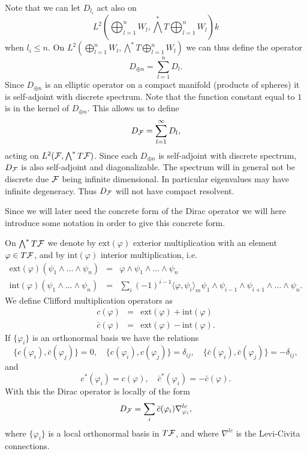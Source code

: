 \documentclass[letterpaper,12pt]{article}
\def\cf{{\cal F}}
\newcommand{\cF}{{\cal F}}
\begin{document}
Note that we can  let $D_{l_i}$ act also on   $$L^2 (\bigoplus_{l=1}^nW_l, \bigwedge^* T\bigoplus_{l=1}^n W_l)k$$ when $l_i\leq n$.   
On 
$L^2 (\bigoplus_{l=1}^nW_l, \bigwedge^* T\bigoplus_{l=1}^n W_l)$
we can thus define the operator
$$D_{\oplus n} =\sum_{{l=1}}^n D_l .$$
Since $D_{\oplus n}$ is an elliptic operator on a compact manifold (products of spheres) it is self-adjoint with discrete spectrum.     Note that the function constant equal to $1$ is in the kernel of $D_{\oplus n}$. This allows us to define 
$$D_\cf= \sum_{{l=1}}^\infty D_l ,$$
acting on $L^2(\cF ,\bigwedge^* T\cF)$. Since each  $D_{\oplus n}$ is self-adjoint with discrete spectrum, $D_\cf$ is also self-adjoint and diagonalizable. The spectrum will in general not be discrete due $\cf$ being infinite dimensional.  In particular eigenvalues may have infinite degeneracy.  
Thus $D_\cf$  will not have compact resolvent.



Since we will later need the concrete form of the Dirac operator we will here introduce some notation in order to give this concrete form. 

On $\bigwedge^*T\cF$ we denote by $\mbox{ext} (\varphi)$ exterior multiplication with an element $\varphi \in T\cF$, and by $\mbox{int} (\varphi )$ interior multiplication, i.e.
\begin{eqnarray*}
\mbox{ext} (\varphi )(\psi_1\wedge \ldots \wedge \psi_n)&=& \varphi \wedge \psi_1 \wedge  \ldots \wedge \psi_n \\
\mbox{int} (\varphi )(\psi_1\wedge \ldots \wedge \psi_n)&=&\sum_i(-1)^{i-1} \langle  \varphi, \psi_i\rangle_m \psi_1\wedge \psi_{i-1}\wedge \psi_{i+1}\wedge \ldots \wedge \psi_n .
\end{eqnarray*}
We define Clifford multiplication operators as 
\begin{eqnarray*}
c(\varphi ) &= &\mbox{ext} (\varphi) +\mbox{int} ( \varphi ) \\
\bar{c}(\varphi ) &= &\mbox{ext} (\varphi) -\mbox{int} ( \varphi ) . 
\end{eqnarray*}
If $\{\varphi_i \}$ is an orthonormal basis we have the relations 
$$ \{c(\varphi_i  ),\bar{c}(\varphi_j  )  \}=0, \quad \{c(\varphi_i  ),c(\varphi_j  )  \}=\delta_{ij}, \quad \{\bar{c}(\varphi_i  ),\bar{c}(\varphi_j  )  \}=-\delta_{ij} ,$$
and 
$$c^*(\varphi_i)=c(\varphi), \quad \bar{c}^*(\varphi_i)=-\bar{c}(\varphi) .$$
With this the Dirac operator is locally of the form
$$D_\cf =\sum_{i} \bar{c}(\varphi_i) \nabla_{\varphi_i}^{lc} , $$
where $\{\varphi_i \}$ is a local orthonormal basis in $T\cf$, and where $\nabla^{lc}$ is the Levi-Civita connections.
\end{document}
